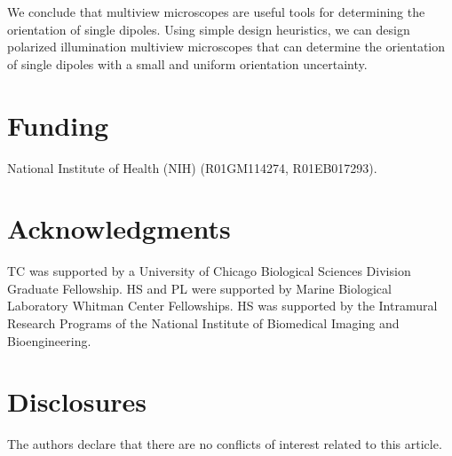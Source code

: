 \documentclass[10pt]{article}
\begin{document}
We conclude that multiview microscopes are useful tools for determining the
orientation of single dipoles. Using simple design heuristics, we can design
polarized illumination multiview microscopes that can determine the orientation
of single dipoles with a small and uniform orientation uncertainty.

\section*{Funding}
National Institute of Health (NIH) (R01GM114274, R01EB017293).

\section*{Acknowledgments}
TC was supported by a University of Chicago Biological Sciences Division
Graduate Fellowship. HS and PL were supported by Marine Biological Laboratory
Whitman Center Fellowships. HS was supported by the Intramural Research
Programs of the National Institute of Biomedical Imaging and Bioengineering.

\section*{Disclosures}
The authors declare that there are no conflicts of interest related to this article.
\end{document}
